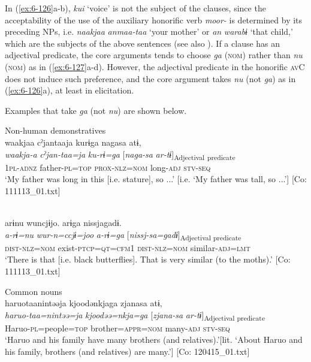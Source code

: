 In (\ref{ex:6-126}a-b), \textit{kui} ‘voice’ is not the subject of the clauses, since the acceptability of the use of the auxiliary honorific verb \textit{moor-} is determined by its preceding NPs, i.e. \textit{naakjaa} \textit{anmaa-taa} ‘your mother’ or \textit{an} \textit{warabɨ} ‘that child,’ which are the subjects of the above sentences (see also ). If a clause has an adjectival predicate, the core arguments tends to choose \textit{ga} (\textsc{nom}) rather than \textit{nu} (\textsc{nom}) as in (\ref{ex:6-127}a-d). However, the adjectival predicate in the honorific \textsc{av}C does not induce such preference, and the core argument takes \textit{nu} (not \textit{ga}) as in (\ref{ex:6-126}a), at least in elicitation.

Examples that take \textit{ga} (not \textit{nu}) are shown below.

\ea\label{ex:6-127}
 Non-human demonstratives\\
 \ea
 {\TM}
\glll waakjaa  cˀjantaaja  kurɨga  nagasa  atɨ,\\
\textit{waakja-a}  \textit{cˀjan-taa=ja}  \textit{ku-rɨ=ga}  [\textit{naga-sa}  \textit{ar-tɨ}]\textsubscript{Adjectival} \textsubscript{predicate}\\
1\textsc{pl}-\textsc{adnz}  father-\textsc{pl}=\textsc{top}  \textsc{prox}-\textsc{nlz}=\textsc{nom}  long-\textsc{adj}  \textsc{stv}-\textsc{seq}\\
\glt ‘My father was long in this [i.e. stature], so ...’ [i.e. ‘My father was tall, so ...’]      [Co: 111113\_01.txt]

\ex{}\\
{\TM}
\glll  arɨnu  wuncjɨjo.  arɨga     nissjagadɨ.\\
\textit{a-rɨ=nu}  \textit{wur-n=ccjɨ=joo}  \textit{a-rɨ=ga}  [\textit{nissj-sa=gadɨ}]\textsubscript{Adjectival predicate}\\
\textsc{dist}-\textsc{nlz}=\textsc{nom}  exist-\textsc{ptcp}=\textsc{qt}=\textsc{cfm}1  \textsc{dist}-\textsc{nlz}=\textsc{nom}  similar-\textsc{adj}=\textsc{lmt}\\
\glt ‘There is that [i.e. black butterflies]. That is very similar (to the moths).’ [Co: 111113\_01.txt]

  Common nouns\\

\ex
{\TM}
\glll haruotaanintəəja  kjoodənkjaga  zjanasa  atɨ,\\
\textit{haruo-taa=nintəə=ja}  \textit{kjoodəə=nkja=ga}  [\textit{zjana-sa}  \textit{ar-tɨ}]\textsubscript{Adjectival predicate}\\
Haruo-\textsc{pl}=people=\textsc{top}  brother=\textsc{appr}=\textsc{nom}  many-\textsc{adj}  \textsc{stv}-\textsc{seq}\\
\glt ‘Haruo and his family have many brothers (and relatives).’[lit. ‘About Haruo and his family, brothers (and relatives) are many.’]      [Co: 120415\_01.txt]


